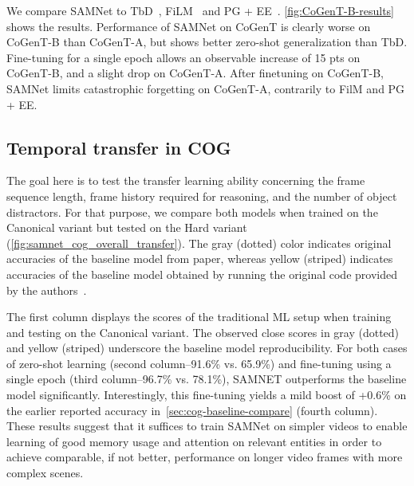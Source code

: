 We compare SAMNet to TbD~\cite{mascharka2018transparency}, FiLM~\cite{perez2018film} and PG + EE~\cite{johnson2017inferring}. \cref{fig:CoGenT-B-results} shows the results. Performance of SAMNet on CoGenT is clearly worse on CoGenT-B than CoGenT-A, but shows better zero-shot generalization than TbD. Fine-tuning for a single epoch allows an observable increase of 15 pts on CoGenT-B, and a slight drop on CoGenT-A. After finetuning on CoGenT-B, SAMNet limits catastrophic forgetting on CoGenT-A, contrarily to FilM and PG + EE.

\subsection{Temporal transfer in COG}
\label{sec:temporal}

The goal here is to test the transfer learning ability concerning the frame sequence length, frame history required for reasoning, and the number of object distractors.
For that purpose, we compare both models when trained on the Canonical variant but tested on the Hard variant (\cref{fig:samnet_cog_overall_transfer}).
The gray (dotted) color indicates original accuracies of the baseline model from paper,
whereas yellow (striped) indicates accuracies of the baseline model obtained by running the original code provided by the authors~\cite{yang2018implement}.

The first column displays the scores of the traditional ML setup when training and testing on the Canonical variant.
The observed close scores in gray (dotted) and yellow (striped) underscore the baseline model reproducibility.
For both cases of zero-shot learning (second column--91.6\% vs. 65.9\%) and fine-tuning using a single epoch (third column--96.7\% vs. 78.1\%), SAMNET outperforms the baseline model significantly.
Interestingly, this fine-tuning yields a mild boost of +0.6\% on the earlier reported accuracy in~\cref{sec:cog-baseline-compare} (fourth column).
These results suggest that it suffices to train SAMNet on simpler videos to enable learning of good memory usage and attention on relevant entities in order to achieve comparable, if not better, performance on longer video frames with more complex scenes.

